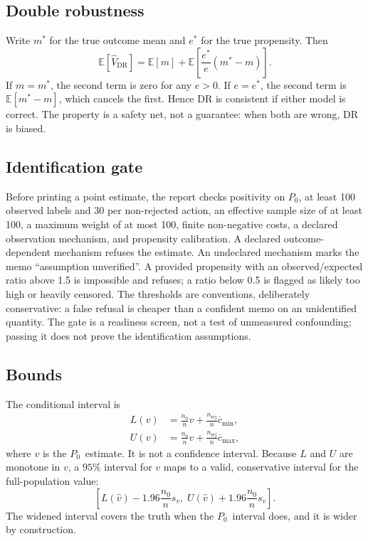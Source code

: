 \documentclass[conference]{IEEEtran}
\newcommand{\Pzero}{\ensuremath{P_0}}
\begin{document}
\subsection{Double robustness}
Write $m^\ast$ for the true outcome mean and $e^\ast$ for the true propensity. Then
\begin{equation}
\mathbb{E}[\hat{V}_{\text{DR}}]=\mathbb{E}[m]+\mathbb{E}\left[\frac{e^\ast}{e}(m^\ast-m)\right].
\end{equation}
If $m=m^\ast$, the second term is zero for any $e>0$. If $e=e^\ast$, the second term is $\mathbb{E}[m^\ast-m]$, which cancels the first. Hence DR is consistent if either model is correct. The property is a safety net, not a guarantee: when both are wrong, DR is biased.

\subsection{Identification gate}
Before printing a point estimate, the report checks positivity on \Pzero, at least 100 observed labels and 30 per non-rejected action, an effective sample size of at least 100, a maximum weight of at most 100, finite non-negative costs, a declared observation mechanism, and propensity calibration. A declared outcome-dependent mechanism refuses the estimate. An undeclared mechanism marks the memo ``assumption unverified''. A provided propensity with an observed/expected ratio above 1.5 is impossible and refuses; a ratio below 0.5 is flagged as likely too high or heavily censored. The thresholds are conventions, deliberately conservative: a false refusal is cheaper than a confident memo on an unidentified quantity. The gate is a readiness screen, not a test of unmeasured confounding; passing it does not prove the identification assumptions.

\subsection{Bounds}
The conditional interval is
\begin{align}
L(v)&=\frac{n_0}{n}v+\frac{n_{\text{rej}}}{n}\overline{c}_{\min},\\
U(v)&=\frac{n_0}{n}v+\frac{n_{\text{rej}}}{n}\overline{c}_{\max},
\end{align}
where $v$ is the \Pzero\ estimate. It is not a confidence interval. Because $L$ and $U$ are monotone in $v$, a $95\%$ interval for $v$ maps to a valid, conservative interval for the full-population value:
\begin{equation}
\left[L(\hat{v})-1.96\frac{n_0}{n}s_v,\;U(\hat{v})+1.96\frac{n_0}{n}s_v\right].
\end{equation}
The widened interval covers the truth when the \Pzero\ interval does, and it is wider by construction.
\end{document}
